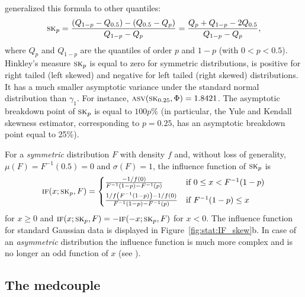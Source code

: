 \citet{hinkley:1975} generalized this formula to other quantiles:
\[
    \stsc{SK}_p 
    = \frac{(Q_{1-p} - Q_{0.5}) - (Q_{0.5} - Q_p)}{Q_{1-p} - Q_p}
    = \frac{Q_p + Q_{1-p} - 2Q_{0.5}}{Q_{1-p} - Q_p},
\]
where $Q_p$ and $Q_{1-p}$ are the quantiles of order $p$ and $1-p$ (with
$0<p<0.5$). Hinkley's measure $\stsc{SK}_p$ is equal to zero for symmetric
distributions, is positive for right tailed (left skewed) and negative for left
tailed (right skewed) distributions. It has a much smaller asymptotic variance
under the standard normal distribution than $\gamma_1$. For instance,
$\stsc{ASV}(\stsc{SK}_{0.25}, \Phi) = 1.8421$.                                  
The asymptotic breakdown point of $\stsc{SK}_p$ is equal to $100p\%$ (in
particular, the Yule and Kendall skewness estimator, corresponding to $p=0.25$,
has an asymptotic breakdown point equal to 25\%).

For a \emph{symmetric} distribution $F$ with density $f$ and, without loss of
generality, $\mu(F) = F^{-1}(0.5) = 0$ and $\sigma(F) = 1$, the influence
function of $\stsc{SK}_p$ is
\[
    \stsc{IF}(x; \stsc{SK}_p, F) =
    \begin{cases}
        \frac{-1 / f(0)}{F^{-1}(1-p) - F^{-1}(p)}                            & \text{if $0\leq x < F^{-1}(1-p)$} \\[1ex]
        \frac{1/f\left(F^{-1}(1-p)\right) - 1/f(0)}{F^{-1}(1-p) - F^{-1}(p)} & \text{if $F^{-1}(1-p)\leq x$}
    \end{cases}
\]
for $x \geq 0$ and $\stsc{IF}(x; \stsc{SK}_p, F) = -\stsc{IF}(-x;
\stsc{SK}_p, F)$ for $x<0$. The influence function for standard Gaussian data
is displayed in Figure~\ref{fig:stat:IF_skew}b. In case of an
\emph{asymmetric} distribution the influence function is much more complex
and is no longer an odd function of $x$ (see \citealp[p.~101]{groeneveld:1991}).


\subsection{The medcouple}

